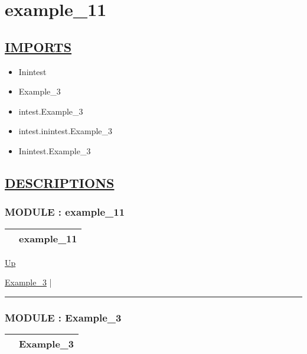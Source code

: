 \chapter*{example\_11}
\hypertarget{ecldoc:toc:example_11}{}

\section*{\underline{IMPORTS}}
\begin{itemize}
\item Inintest
\item Example\_3
\item intest.Example\_3
\item intest.inintest.Example\_3
\item Inintest.Example\_3
\end{itemize}

\section*{\underline{DESCRIPTIONS}}
\subsection*{MODULE : example\_11}
\hypertarget{ecldoc:example_11}{}

{\renewcommand{\arraystretch}{1.5}
\begin{tabularx}{\textwidth}{|>{\raggedright\arraybackslash}l|X|}
\hline
\hspace{0pt} & example\_11 \\
\hline
\end{tabularx}
}

\hyperlink{ecldoc:toc:root}{Up}

\par


\hyperlink{ecldoc:Inintest.Example_3}{Example\_3}  |

\rule{\textwidth}{0.4pt}

\subsection*{MODULE : Example\_3}
\hypertarget{ecldoc:Inintest.Example_3}{}

{\renewcommand{\arraystretch}{1.5}
\begin{tabularx}{\textwidth}{|>{\raggedright\arraybackslash}l|X|}
\hline
\hspace{0pt} & Example\_3 \\
\hline
\end{tabularx}
}

